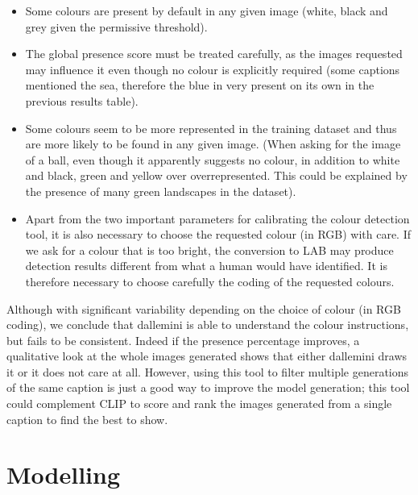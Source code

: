 \documentclass{article}
\begin{document}
\begin{multicols}{2}
\begin{itemize}
    \item Some colours are present by default in any given image (white, black and grey given the permissive threshold).
    \item The global presence score must be treated carefully, as the images requested may influence it even though no colour is explicitly required (some captions mentioned the sea, therefore the blue in very present on its own in the previous results table).
    \item Some colours seem to be more represented in the training dataset and thus are more likely to be found in any given image. (When asking for the image of a ball, even though it apparently suggests no colour, in addition to white and black, green and yellow over overrepresented. This could be explained by the presence of many green landscapes in the dataset).
    \item Apart from the two important parameters for calibrating the colour detection tool, it is also necessary to choose the requested colour (in RGB) with care. If we ask for a colour that is too bright, the conversion to LAB may produce detection results different from what a human would have identified. It is therefore necessary to choose carefully the coding of the requested colours.
\end{itemize}  

Although with significant variability depending on the choice of colour (in RGB coding), we conclude that \gls{dallemini} is able to understand the colour instructions, but fails to be consistent. Indeed if the presence percentage improves, a qualitative look at the whole images generated shows that either \gls{dallemini} draws it or it does not care at all. However, using this tool to filter multiple generations of the same caption is just a good way to improve the model generation; this tool could complement CLIP to score and rank the images generated from a single caption to find the best to show.

\end{multicols}

\pagebreak

\section{Modelling}
\end{document}
